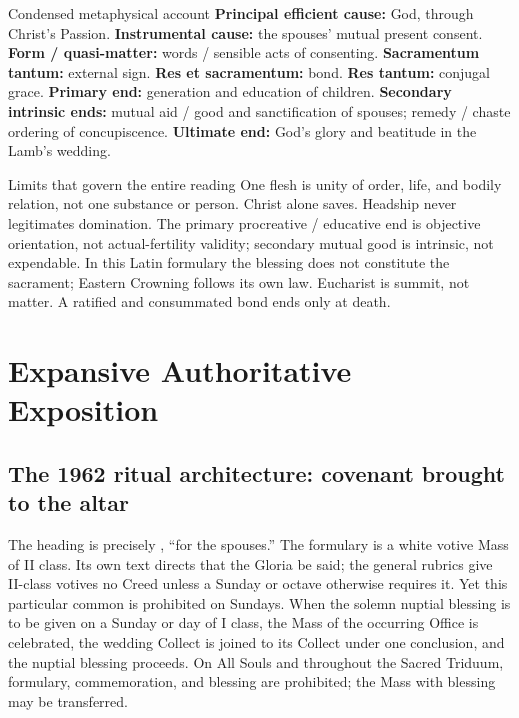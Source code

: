 \begin{deepstudy}
\begin{studybox}{Condensed metaphysical account}
\textbf{Principal efficient cause:} God, through Christ's Passion. \textbf{Instrumental cause:} the spouses' mutual present consent. \textbf{Form / quasi-matter:} words / sensible acts of consenting. \textbf{Sacramentum tantum:} external sign. \textbf{Res et sacramentum:} bond. \textbf{Res tantum:} conjugal grace. \textbf{Primary end:} generation and education of children. \textbf{Secondary intrinsic ends:} mutual aid / good and sanctification of spouses; remedy / chaste ordering of concupiscence. \textbf{Ultimate end:} God's glory and beatitude in the Lamb's wedding.
\end{studybox}

\begin{studybox}{Limits that govern the entire reading}
One flesh is unity of order, life, and bodily relation, not one substance or person. Christ alone saves. Headship never legitimates domination. The primary procreative / educative end is objective orientation, not actual-fertility validity; secondary mutual good is intrinsic, not expendable. In this Latin formulary the blessing does not constitute the sacrament; Eastern Crowning follows its own law. Eucharist is summit, not matter. A ratified and consummated bond ends only at death.
\end{studybox}
\endgroup

\newpage
\section*{Expansive Authoritative Exposition}

\subsection*{The 1962 ritual architecture: covenant brought to the altar}

The heading is precisely , ``for the spouses.'' The formulary is a white votive Mass of II class. Its own text directs that the Gloria be said; the general rubrics give II-class votives no Creed unless a Sunday or octave otherwise requires it. Yet this particular common is prohibited on Sundays. When the solemn nuptial blessing is to be given on a Sunday or day of I class, the Mass of the occurring Office is celebrated, the wedding Collect is joined to its Collect under one conclusion, and the nuptial blessing proceeds. On All Souls and throughout the Sacred Triduum, formulary, commemoration, and blessing are prohibited; the Mass with blessing may be transferred.


\end{deepstudy}
